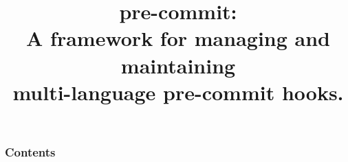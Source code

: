 \documentclass[aspectratio=169]{beamer}
\title[pre-commit]{pre-commit:\\
A framework for managing and maintaining\\
multi-language pre-commit hooks.}
\begin{document}
\begin{frame}
    \titlepage
\end{frame}

\begin{frame}
    \frametitle{Contents}
    \tableofcontents
\end{frame}


\end{document}
